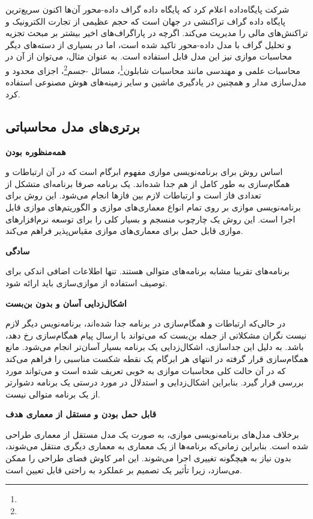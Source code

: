 شرکت پایگاه‌داده  اعلام کرد که پایگاه داده گراف  داده-محور آن‌ها اکنون سریع‌ترین پایگاه داده گراف تراکنشی در جهان است که حجم عظیمی از تجارت الکترونیک و تراکنش‌های مالی را مدیریت می‌کند. اگرچه در پاراگراف‌های اخیر بیشتر بر مبحث تجزیه و تحلیل گراف با مدل  داده-محور تاکید شده است، اما در بسیاری از دسته‌های دیگر محاسبات موازی نیز این مدل قابل استفاده است. به عنوان مثال، می‌توان از آن در محاسبات علمی و مهندسی مانند محاسبات شابلون\footnote{}، مسائل -جسم\footnote{}، اجزای محدود و مدل‌سازی مدار و همچنین در یادگیری ماشین و سایر زمینه‌های هوش مصنوعی استفاده کرد.


\subsection{برتری‌های مدل محاسباتی }
\textbf{همه‌منظوره بودن}

اساس روش  برای برنامه‌نویسی موازی مفهوم ابرگام است که در آن ارتباطات و همگام‌سازی به طور کامل از هم جدا شده‌اند. یک برنامه  صرفا برنامه‌ای متشکل از تعدادی فاز است و ارتباطات لازم بین فازها انجام می‌شود. این روش برای برنامه‌نویسی موازی بر روی تمام انواع معماری‌های موازی و الگوریتم‌های موازی قابل اجرا است. این روش یک چارچوب منسجم و بسیار کلی  را برای توسعه نرم‌افزارهای موازی قابل حمل برای معماری‌های موازی مقیاس‌پذیر فراهم می‌کند.

\textbf{سادگی}

برنامه‌های  تقریبا مشابه برنامه‌های متوالی هستند. تنها اطلاعات اضافی اندکی برای توصیف استفاده از موازی‌سازی باید ارائه شود. 

\textbf{اشکال‌زدایی آسان و بدون بن‌بست}

در حالی‌که ارتباطات و همگام‌سازی در برنامه  جدا شده‌اند، برنامه‌نویس دیگر لازم نیست نگران مشکلاتی از جمله بن‌بست که می‌تواند با ارسال پیام همگام‌سازی رخ دهد، باشد. به دلیل این جداسازی، اشکال‌زدایی یک برنامه  بسیار آسان‌تر انجام می‌شود. مانع همگام‌سازی قرار گرفته در انتهای هر ابرگام یک نقطه شکست مناسبی را فراهم می‌کند که در آن حالت کلی محاسبات موازی به خوبی تعریف شده است و می‌تواند مورد بررسی قرار گیرد. بنابراین اشکال‌زدایی و استدلال در مورد درستی یک برنامه  دشوارتر از یک برنامه متوالی نیست. 

\textbf{قابل حمل بودن و مستقل از معماری هدف}

برخلاف مدل‌های برنامه‌نویسی موازی،  به صورت یک مدل مستقل از معماری طراحی شده است. بنابراین زمانی‌که برنامه‌ها از یک معماری به معماری دیگری منتقل می‌شوند، بدون نیاز به هیچگونه تغییری اجرا می‌شوند. این امر کاوش فضای طراحی را ممکن می‌سازد، زیرا تأثیر یک تصمیم بر عملکرد به راحتی قابل تعیین است.

